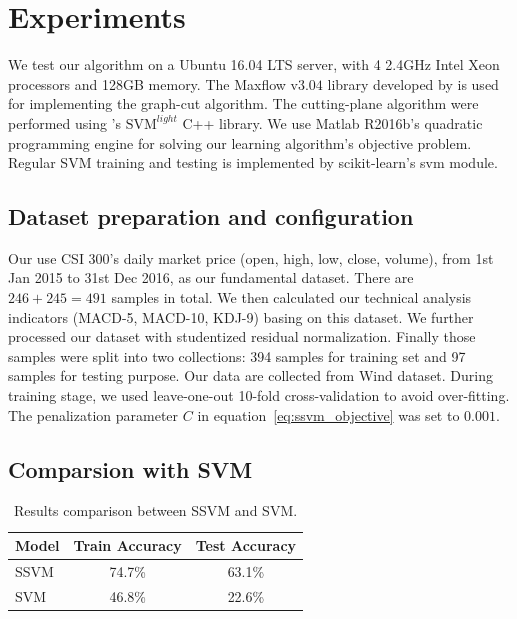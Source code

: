 

\section{Experiments}
\label{sec:experiments}

We test our algorithm on a Ubuntu 16.04 LTS server, with 4 2.4GHz
Intel Xeon processors and 128GB memory. The Maxflow v$3.04$
library developed by  is used for
implementing the graph-cut algorithm. The cutting-plane algorithm
were performed using 's
$\text{SVM}^{light}$ C++ library. We use Matlab R2016b's
quadratic programming engine for solving our learning algorithm's
objective problem. Regular SVM training and testing is
implemented by scikit-learn's svm module.


\subsection{Dataset preparation and configuration}
\label{sec:exp_data}

Our use CSI 300's daily market price (open, high, low, close,
volume), from 1st Jan 2015 to 31st Dec 2016, as our fundamental
dataset. There are $246 + 245 = 491$ samples in total. We then
calculated our technical analysis indicators (MACD-5, MACD-10,
KDJ-9) basing on this dataset. We further processed our dataset
with studentized residual normalization. Finally those samples
were split into two collections: 394 samples for training set and
97 samples for testing purpose. Our data are collected from Wind
dataset. During training stage, we used leave-one-out 10-fold
cross-validation to avoid over-fitting. The penalization
parameter $C$ in equation~\eqref{eq:ssvm_objective} was set to
$0.001$.

\subsection{Comparsion with SVM}
\label{sec:exp_compare}

\begin{table}
  \normalsize
  \centering
  \begin{tabular}{|l|c|c|}
    \hline
    {\sc Model} & {\sc Train Accuracy} & {\sc Test Accuracy}\\
    \hline \hline
    SSVM & 74.7\% & 63.1\% \\
    \hline
    SVM & 46.8\% & 22.6\% \\
    \hline
  \end{tabular}
  \caption{\label{tab:exp_compare} Results comparison
    between SSVM and SVM.}
\end{table}

